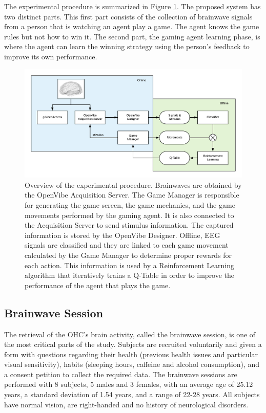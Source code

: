 \documentclass[journal]{IEEEtran}
\begin{document}
The experimental procedure is summarized in Figure \ref{diag:complete_flow}. The proposed system has two distinct parts. This first part consists of the collection of brainwave signals from a person that is watching an agent play a game.  The agent knows the game rules but not how to win it. The second part, the gaming agent learning phase, is where the agent can learn the winning strategy using the person's feedback to improve its own performance.

\begin{figure}
    \centering
    \includegraphics[width=\textwidth]{Images/complete_flow.png}
    \caption{Overview of the experimental procedure. Brainwaves are obtained by the OpenVibe Acquisition Server.  The Game Manager is responsible for generating the game screen, the game mechanics, and the game movements performed by the gaming agent.  It is also connected to the Acquisition Server to send stimulus information.  The captured information is stored by the OpenVibe Designer.  Offline, EEG signals are classified and they are linked to each game movement calculated by the Game Manager to determine proper rewards for each action.  This information is used by a Reinforcement Learning algorithm that iteratively trains a Q-Table in order to improve the performance of the agent that plays the game.}
    \label{diag:complete_flow}
\end{figure}

\subsection{Brainwave Session}
\label{brainwavesession}

The retrieval of the OHC's brain activity, called the brainwave session, is one of the most critical parts of the study.  Subjects are recruited voluntarily and given a form with questions regarding their health (previous health issues and particular visual sensitivity), habits (sleeping hours, caffeine and alcohol consumption), and a consent petition to collect the required data. The brainwave sessions are performed with 8 subjects, 5 males and 3 females, with an average age of 25.12 years, a standard deviation of 1.54 years, and a range of 22-28 years. All subjects have normal vision, are right-handed and no history of neurological disorders.
\end{document}
